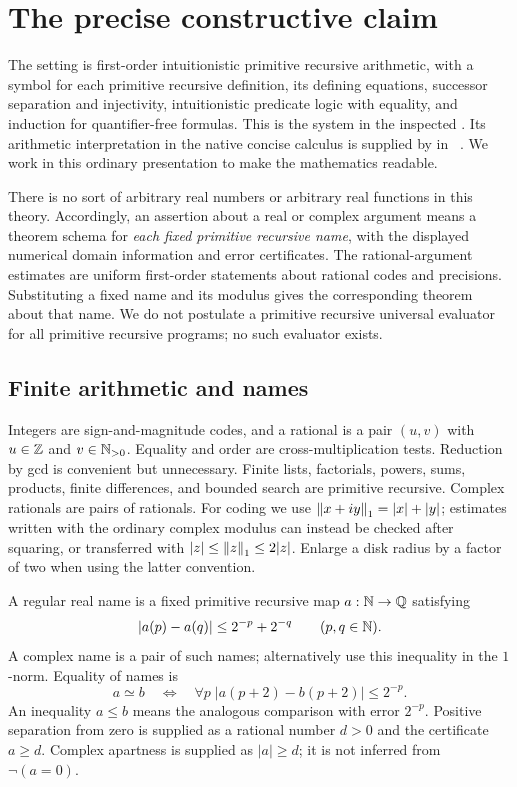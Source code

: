 \section{The precise constructive claim}
\label{sec:foundations}

The setting is first-order intuitionistic primitive recursive arithmetic,
with a symbol for each primitive recursive definition, its defining
equations, successor separation and injectivity, intuitionistic predicate
logic with equality, and induction for quantifier-free formulas. This is
the system  in the inspected .
Its arithmetic interpretation in the native concise calculus is supplied by
 in ~\cite{repo}.
We work in this ordinary presentation to make the mathematics readable.

There is no sort of arbitrary real numbers or arbitrary real functions in
this theory. Accordingly, an assertion about a real or complex argument
means a theorem schema for \emph{each fixed primitive recursive name}, with
the displayed numerical domain information and error certificates. The
rational-argument estimates are uniform first-order statements about
rational codes and precisions. Substituting a fixed name and its modulus
gives the corresponding theorem about that name. We do not postulate a
primitive recursive universal evaluator for all primitive recursive
programs; no such evaluator exists.

\subsection{Finite arithmetic and names}

Integers are sign-and-magnitude codes, and a rational is a pair $(u,v)$
with $u\in\mathbb Z$ and $v\in\mathbb N_{>0}$. Equality and order are cross-multiplication
tests. Reduction by gcd is convenient but unnecessary. Finite lists,
factorials, powers, sums, products, finite differences, and bounded search
are primitive recursive. Complex rationals are pairs of rationals. For
coding we use $\left\|x+iy\right\|_1=|x|+|y|$; estimates written with the ordinary
complex modulus can instead be checked after squaring, or transferred with
$|z|\le\left\|z\right\|_1\le2|z|$. Enlarge a disk radius by a factor of two when
using the latter convention.

\begin{definition}
A regular real name is a fixed primitive recursive map $a:\mathbb N\to\mathbb Q$
satisfying
\[
 |a(p)-a(q)|\le2^{-p}+2^{-q}\qquad(p,q\in\mathbb N).
\]
A complex name is a pair of such names; alternatively use this inequality
in the $1$-norm. Equality of names is
\[
 a\simeq b\quad\Longleftrightarrow\quad
 \forall p\; |a(p+2)-b(p+2)|\le2^{-p}.
\]
An inequality $a\le b$ means the analogous comparison with error
$2^{-p}$. Positive separation from zero is supplied as a rational number
$d>0$ and the certificate $a\ge d$. Complex apartness is supplied as
$|a|\ge d$; it is not inferred from $\neg(a=0)$.
\end{definition}

